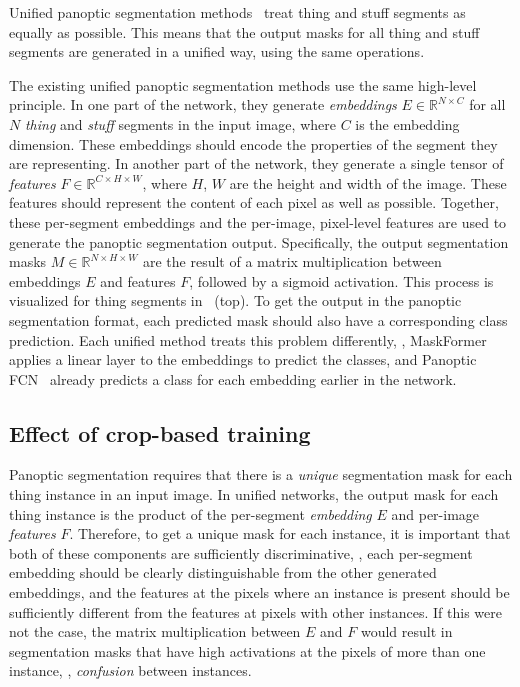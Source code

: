\documentclass[10pt,twocolumn,letterpaper]{article}
\begin{document}
Unified panoptic segmentation methods~\cite{cheng2021mask2former,cheng2021maskformer,li2021panopticfcn,wang2021maxdeeplab,zhang2021knet} treat thing and stuff segments as equally as possible. This means that the output masks for all thing and stuff segments are generated in a unified way, using the same operations. 

The existing unified panoptic segmentation methods use the same high-level principle. In one part of the network, they generate \textit{embeddings} $E \in \mathbb{R}^{{N}\times{C}}$ for all $N$ \textit{thing} and \textit{stuff} segments in the input image, where $C$ is the embedding dimension. These embeddings should encode the properties of the segment they are representing. In another part of the network, they generate a single tensor of \textit{features} $F \in \mathbb{R}^{{C}\times{H}\times{W}}$, where $H$, $W$ are the height and width of the image. These features should represent the content of each pixel as well as possible. Together, these per-segment embeddings and the per-image, pixel-level features are used to generate the panoptic segmentation output. Specifically, the output segmentation masks $M \in \mathbb{R}^{{N}\times{H}\times{W}}$ are the result of a matrix multiplication between embeddings $E$ and features $F$, followed by a sigmoid activation. This process is visualized for thing segments in~ (top). To get the output in the panoptic segmentation format, each predicted mask should also have a corresponding class prediction. Each unified method treats this problem differently, \eg, MaskFormer~\cite{cheng2021maskformer} applies a linear layer to the embeddings to predict the classes, and Panoptic FCN~\cite{li2021panopticfcn} already predicts a class for each embedding earlier in the network.

\subsection{Effect of crop-based training}
\label{sec:problem_description:crop_training}
Panoptic segmentation requires that there is a \textit{unique} segmentation mask for each thing instance in an input image. In unified networks, the output mask for each thing instance is the product of the per-segment \textit{embedding} $E$ and per-image \textit{features} $F$. Therefore, to get a unique mask for each instance, it is important that both of these components are sufficiently discriminative, \ie, each per-segment embedding should be clearly distinguishable from the other generated embeddings, and the features at the pixels where an instance is present should be sufficiently different from the features at pixels with other instances. If this were not the case, the matrix multiplication between $E$ and $F$ would result in segmentation masks that have high activations at the pixels of more than one instance, \ie, \textit{confusion} between instances.
\end{document}
